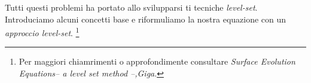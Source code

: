 Tutti questi problemi ha portato allo svilupparsi ti tecniche \emph{level-set}. Introduciamo alcuni concetti base e riformuliamo la nostra equazione con un \emph{approccio level-set}.%
\footnote{Per maggiori chiamrimenti o approfondimente consultare \emph{Surface Evolution Equations-- a level set method --,Giga}.}    %




